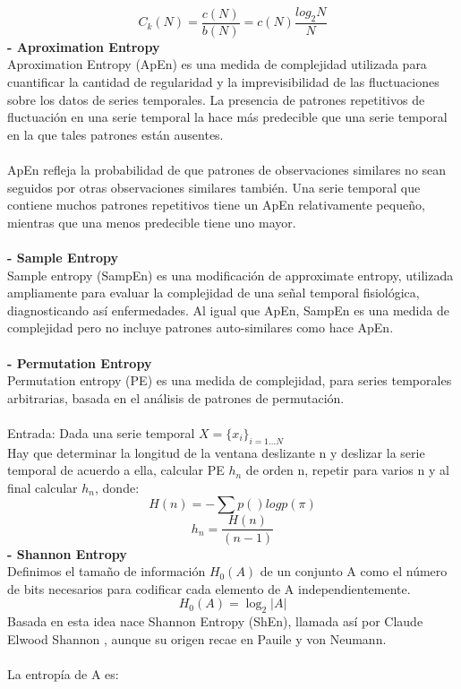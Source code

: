 \documentclass[14pt]{extarticle}
\theoremstyle{definition}
\theoremstyle{remark}
\begin{document}
\begin{equation}
\label{eq:kolmogorovnormalized}
C_{k}(N) = \frac{c(N)}{b(N)} = c(N)\frac{log_2 N}{N}
\end{equation}
\textbf{- Aproximation Entropy}\\
Aproximation Entropy (ApEn) es una medida de complejidad utilizada para cuantificar la cantidad de regularidad y la imprevisibilidad de las fluctuaciones sobre los datos de series temporales. La presencia de patrones repetitivos de fluctuación en una serie temporal la hace más predecible que una serie temporal en la que tales patrones están ausentes.\\\\ApEn refleja la probabilidad de que patrones de observaciones similares no sean seguidos por otras observaciones similares también. Una serie temporal que contiene muchos patrones repetitivos tiene un ApEn relativamente pequeño, mientras que una menos predecible tiene uno mayor.\\\\
\textbf{- Sample Entropy}\\
Sample entropy (SampEn) es una modificación de approximate entropy, utilizada ampliamente para evaluar la complejidad de una señal temporal fisiológica, diagnosticando así enfermedades. Al igual que ApEn, SampEn es una medida de complejidad pero no incluye patrones auto-similares como hace ApEn.\\\\
\textbf{- Permutation Entropy}\\
Permutation entropy (PE) es una medida de complejidad, para series temporales arbitrarias, basada en el análisis de patrones de permutación.\\\\
Entrada: Dada una serie temporal \(X = \{x_{i}\}_{i=1...N}\)\\
Hay que determinar la longitud de la ventana deslizante n y deslizar la serie temporal de acuerdo a ella, calcular PE \(h_{n}\) de orden n, repetir para varios n y al final calcular \(h_{n}\), donde:
\[H(n) = -\sum p()log p(\pi)\]
\[h_{n} = \frac{H(n)}{(n-1)}\]
\textbf{- Shannon Entropy}\citep{article:shannonentropy}\citep{wiki:shannonentropy}\\Definimos el tamaño de información \(H_{0}(A)\) de un conjunto A como el número de bits necesarios para codificar cada elemento de A independientemente.
\[H_{0}(A) = \log_{2}|A|\]
Basada en esta idea nace Shannon Entropy (ShEn), llamada así por Claude Elwood Shannon \citep{wiki:shannon}, aunque su origen recae en Pauile y von Neumann.\\\\La entropía de A es:
\end{document}
